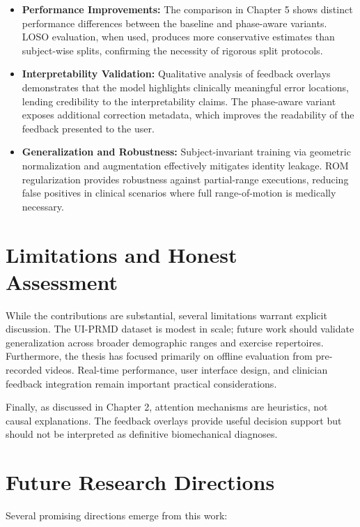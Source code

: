 \begin{itemize}
    \item \textbf{Performance Improvements:} The comparison in Chapter 5 shows distinct performance differences between the baseline and phase-aware variants. LOSO evaluation, when used, produces more conservative estimates than subject-wise splits, confirming the necessity of rigorous split protocols.
    
    \item \textbf{Interpretability Validation:} Qualitative analysis of feedback overlays demonstrates that the model highlights clinically meaningful error locations, lending credibility to the interpretability claims. The phase-aware variant exposes additional correction metadata, which improves the readability of the feedback presented to the user.
    
    \item \textbf{Generalization and Robustness:} Subject-invariant training via geometric normalization and augmentation effectively mitigates identity leakage. ROM regularization provides robustness against partial-range executions, reducing false positives in clinical scenarios where full range-of-motion is medically necessary.
\end{itemize}

\section{Limitations and Honest Assessment}
While the contributions are substantial, several limitations warrant explicit discussion. The UI-PRMD dataset is modest in scale; future work should validate generalization across broader demographic ranges and exercise repertoires. Furthermore, the thesis has focused primarily on offline evaluation from pre-recorded videos. Real-time performance, user interface design, and clinician feedback integration remain important practical considerations.

Finally, as discussed in Chapter 2, attention mechanisms are heuristics, not causal explanations. The feedback overlays provide useful decision support but should not be interpreted as definitive biomechanical diagnoses.

\section{Future Research Directions}
Several promising directions emerge from this work:

